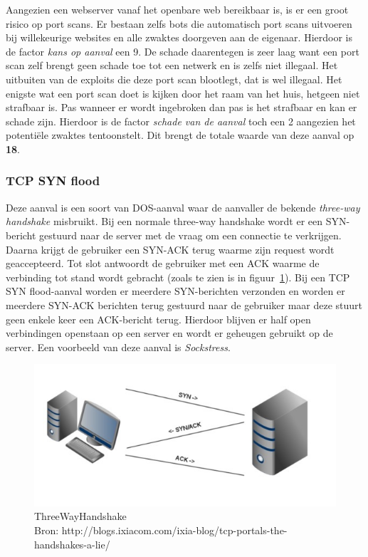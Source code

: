 \documentclass[pdftex,a4paper,12pt]{report}
\newcommand*{\captionsource}[2]{%
  \caption[{#1}]{%
    #1%
    \\\hspace{\linewidth}%
    Bron: #2%
  }%
}
\begin{document}
Aangezien een webserver vanaf het openbare web bereikbaar is, is er een groot risico op port scans. Er bestaan zelfs bots die automatisch port scans uitvoeren bij willekeurige websites en alle zwaktes doorgeven aan de eigenaar. Hierdoor is de factor \textit{kans op aanval} een 9. De schade daarentegen is zeer laag want een port scan zelf brengt geen schade toe tot een netwerk en is zelfs niet illegaal. Het uitbuiten van de exploits die deze port scan blootlegt, dat is wel illegaal. Het enigste wat een port scan doet is kijken door het raam van het huis, hetgeen niet strafbaar is. Pas wanneer er wordt ingebroken dan pas is het strafbaar en kan er schade zijn. Hierdoor is de factor \textit{schade van de aanval} toch een 2 aangezien het potentiële zwaktes tentoonstelt. Dit brengt de totale waarde van deze aanval op \textbf{18}.

\subsubsection{TCP SYN flood} 
Deze aanval is een soort van DOS-aanval waar de aanvaller de bekende \textit{three-way handshake} misbruikt. Bij een normale three-way handshake wordt er een SYN-bericht gestuurd naar de server met de vraag om een connectie te verkrijgen. Daarna krijgt de gebruiker een SYN-ACK terug waarme zijn request wordt geaccepteerd. Tot slot antwoordt de gebruiker met een ACK waarme de verbinding tot stand wordt gebracht (zoals te zien is in figuur~\ref{img:ThreeWayHandshake}). Bij een TCP SYN flood-aanval worden er meerdere SYN-berichten verzonden en worden er meerdere SYN-ACK berichten terug gestuurd naar de gebruiker maar deze stuurt geen enkele keer een ACK-bericht terug. Hierdoor blijven er half open verbindingen openstaan op een server en wordt er geheugen gebruikt op de server. Een voorbeeld van deze aanval is \textit{Sockstress}. \citep{Rouse2014}    

\begin{figure}[H]
\begin{center}
\includegraphics{img/ThreeWayHandshake}
\end{center}
\label{img:ThreeWayHandshake}
\captionsource{ThreeWayHandshake}{http://blogs.ixiacom.com/ixia-blog/tcp-portals-the-handshakes-a-lie/}
\end{figure}
\end{document}
